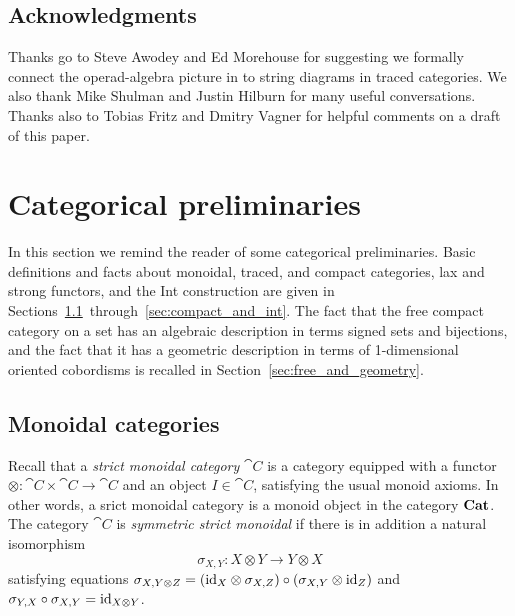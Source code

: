 \documentclass[11pt,oneside,article]{memoir}
\begin{document}
\section*{Acknowledgments}

Thanks go to Steve Awodey and Ed Morehouse for suggesting we formally connect the operad-algebra
picture in \cite{RupelSpivak} to string diagrams in traced categories. We also thank Mike Shulman
and Justin Hilburn for many useful conversations. Thanks also to Tobias Fritz and Dmitry Vagner for helpful comments on a draft of this paper.

\chapter{Categorical preliminaries}\label{chap:traced_categories}

In this section we remind the reader of some categorical preliminaries. Basic definitions and facts
about monoidal, traced, and compact categories, lax and strong functors, and the Int construction
are given in Sections~\ref{sec:prelim_monoidal}~through~\ref{sec:compact_and_int}. The fact that the
free compact category on a set has an algebraic description in terms signed sets and bijections, and
the fact that it has a geometric description in terms of 1-dimensional oriented cobordisms is
recalled in Section~\ref{sec:free_and_geometry}.

\section{Monoidal categories}\label{sec:prelim_monoidal}

Recall that a \emph{strict monoidal category} $\cat{C}$ is a category equipped with a functor
$\otimes\colon\cat{C}\times\cat{C}\to\cat{C}$ and an object $I\in\cat{C}$, satisfying the usual
monoid axioms. In other words, a srict monoidal category is a monoid object in the category $\mathbf{Cat}$.
The category $\cat{C}$ is \emph{symmetric strict monoidal} if there is in addition a natural isomorphism
\begin{equation*}
   \sigma_{X,Y}\colon X\otimes Y\to Y\otimes X
\end{equation*}
satisfying equations $\sigma_{X,Y\otimes Z}=(\mathrm{id}_X\otimes\sigma_{X,Z})\circ(\sigma_{X,Y}\otimes
\mathrm{id}_Z)$ and
$\sigma_{Y,X}\circ\sigma_{X,Y}=\mathrm{id}_{X\otimes Y}$.
\end{document}
